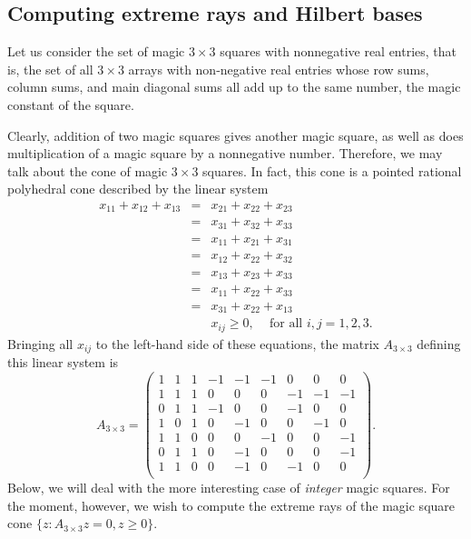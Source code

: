 \subsection{Computing extreme rays and Hilbert bases}

Let us consider the set of magic $3\times 3$ squares with nonnegative
real entries, that is, the set of all $3\times 3$ arrays with
non-negative real entries whose row sums, column sums, and main
diagonal sums all add up to the same number, the magic constant of the
square. 
\vspace{-0.3cm}
\begin{center}
  
\end{center}
\vspace{-0.4cm}
Clearly, addition of two magic squares gives another magic square,
as well as does multiplication of a magic square by a nonnegative
number. Therefore, we may talk about the cone of magic $3\times 3$
squares. In fact, this cone is a pointed rational polyhedral cone
described by the linear system 
\begin{eqnarray*}
x_{11}+x_{12}+x_{13}
& = & x_{21}+x_{22}+x_{23}\\
& = & x_{31}+x_{32}+x_{33}\\
& = & x_{11}+x_{21}+x_{31}\\
& = & x_{12}+x_{22}+x_{32}\\
& = & x_{13}+x_{23}+x_{33}\\
& = & x_{11}+x_{22}+x_{33}\\
& = & x_{31}+x_{22}+x_{13}\\
&   & x_{ij} \geq 0,\;\;\; \text{ for all } i,j=1,2,3.
\end{eqnarray*}
Bringing all $x_{ij}$ to the left-hand side of these equations, the
matrix $A_{3\times 3}$ defining this linear system is
\[
A_{3\times 3}=\left(
\begin{array}{rrrrrrrrr}
1 & 1 & 1 & -1 & -1 & -1 &  0 &  0 &  0\\
1 & 1 & 1 &  0 &  0 &  0 & -1 & -1 & -1\\
0 & 1 & 1 & -1 &  0 &  0 & -1 &  0 &  0\\
1 & 0 & 1 &  0 & -1 &  0 &  0 & -1 &  0\\
1 & 1 & 0 &  0 &  0 & -1 &  0 &  0 & -1\\
0 & 1 & 1 &  0 & -1 &  0 &  0 &  0 & -1\\
1 & 1 & 0 &  0 & -1 &  0 & -1 &  0 &  0\\
\end{array}
\right).
\]
Below, we will deal with the more interesting case of \emph{integer} magic
squares. For the moment, however, we wish to compute the extreme rays
of the magic square cone $\{z:A_{3\times 3}z=0,z\geq 0\}$. 

